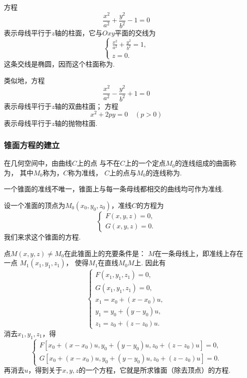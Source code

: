 \begin{example}
方程\[
	\frac{x^2}{a^2} + \frac{y^2}{b^2} - 1 = 0
\]
表示母线平行于\(z\)轴的柱面，它与\(Oxy\)平面的交线为\[
	\left\{ \begin{array}{l}
		\frac{x^2}{a^2} + \frac{y^2}{b^2} = 1, \\
		z = 0.
	\end{array} \right.
\]
这条交线是椭圆，因而这个柱面称为.

类似地，方程\[
	\frac{x^2}{a^2} - \frac{y^2}{b^2} + 1 = 0
\]
表示母线平行于\(z\)轴的双曲柱面；
方程\[
	x^2 + 2py = 0
	\quad(p>0)
\]
表示母线平行于\(z\)轴的抛物柱面.
\end{example}

\subsubsection{锥面方程的建立}
在几何空间中，由曲线\(C\)上的点
与不在\(C\)上的一个定点\(M_0\)的连线组成的曲面称为，
其中\(M_0\)称为，\(C\)称为准线，
\(C\)上的点与\(M_0\)的连线称为.

一个锥面的准线不唯一，锥面上与每一条母线都相交的曲线均可作为准线.

设一个准面的顶点为\(M_0(x_0,y_0,z_0)\)，准线\(C\)的方程为\[
	\left\{ \begin{array}{l}
		F(x,y,z) = 0, \\
		G(x,y,z) = 0.
	\end{array} \right.
\]
我们来求这个锥面的方程.

点\(M(x,y,z)\neq M_0\)在此锥面上的充要条件是：\allowbreak
\(M\)在一条母线上，即准线上存在一点\break
\(M_1(x_1,y_1,z_1)\)，
使得\(M_1\)在直线\(M_0 M\)上.
因此有\[
	\left\{ \begin{array}{l}
		F(x_1,y_1,z_1) = 0, \\
		G(x_1,y_1,z_1) = 0, \\
		x_1 = x_0 + (x - x_0) u, \\
		y_1 = y_0 + (y - y_0) u, \\
		z_1 = z_0 + (z - z_0) u.
	\end{array} \right.
\]
消去\(x_1,y_1,z_1\)，得\[
	\left\{ \begin{array}{l}
		F[x_0 + (x-x_0) u,y_0 + (y-y_0) u, z_0 + (z - z_0) u] = 0, \\
		G[x_0 + (x-x_0) u,y_0 + (y-y_0) u, z_0 + (z - z_0) u] = 0.
	\end{array} \right.
\]
再消去\(u\)，得到关于\(x,y,z\)的一个方程，它就是所求锥面（除去顶点）的方程.

